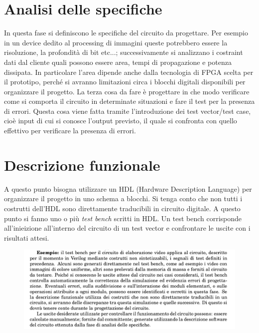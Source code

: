 \documentclass{book}
\begin{document}
\section{Analisi delle specifiche}
    In questa fase si definiscono le specifiche del circuito da progettare. Per esempio in un device dedito al processing di immagini queste potrebbero essere la risoluzione, la profondità di bit etc...; successivamente si analizzano i costraint dati dal cliente quali possono essere area, tempi di propagazione e potenza dissipata. In particolare l'area dipende anche dalla tecnologia di FPGA scelta per il prototipo, perché si avranno limitazioni circa i blocchi digitali disponibili per organizzare il progetto. La terza cosa da fare è progettare in che modo verificare come si comporta il circuito in determinate situazioni e fare il test per la presenza di errori. Questa cosa viene fatta tramite l'introduzione dei test vector/test case, cioè input di cui si conosce l'output previsto, il quale si confronta con quello effettivo per verificare la presenza di errori.
\section{Descrizione funzionale}
    A questo punto bisogna utilizzare un HDL (Hardware Description Language) per organizzare il progetto in uno schema a blocchi. Si tenga conto che non tutti i costrutti dell'HDL sono direttamente traducibili in circuito digitale. A questo punto si fanno uno o più \textit{test bench} scritti in HDL. Un test bench corrisponde all'inieizione all'interno del circuito di un test vector e confrontare le uscite con i risultati attesi.
    \begin{figure}[h!]
        \centering
        \includegraphics[width=1.1\linewidth]{img/chapt3img2.png}
    \end{figure}
\end{document}
